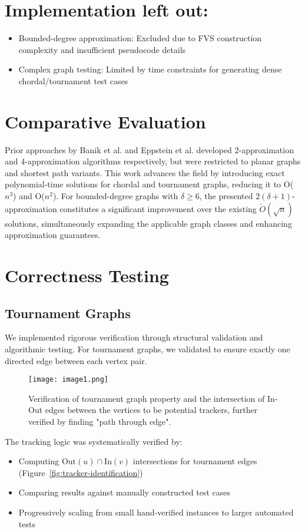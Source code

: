 \documentclass{article}
\begin{document}
\section*{Implementation left out:}
\begin{itemize}
    \item Bounded-degree approximation: Excluded due to FVS construction complexity and insufficient pseudocode details
    \item Complex graph testing: Limited by time constraints for generating dense chordal/tournament test cases
\end{itemize}

\section*{Comparative Evaluation}
Prior approaches by Banik et al. and Eppstein et al. developed 2-approximation and 4-approximation algorithms respectively, but were restricted to planar graphs and shortest path variants. This work advances the field by introducing exact polynomial-time solutions for chordal and tournament graphs, reducing it to O($n^3$) and O($n^2$). For bounded-degree graphs with $\delta \geq 6$, the presented $2(\delta+1)$-approximation constitutes a significant improvement over the existing $\widetilde{O}(\sqrt{n})$ solutions, simultaneously expanding the applicable graph classes and enhancing approximation guarantees.

\section*{Correctness Testing}

\subsection*{Tournament Graphs}
We implemented rigorous verification through structural validation and algorithmic testing. For tournament graphs, we validated to ensure exactly one directed edge between each vertex pair.

\begin{figure}[H]
\centering
\texttt{[image: image1.png]}
\caption{Verification of tournament graph property and the intersection of In-Out edges between the vertices to be potential trackers, further verified by finding "path through edge".}
\label{fig:tournament-verification}
\end{figure}

The tracking logic was systematically verified by:
\begin{itemize}
\item Computing $\text{Out}(u) \cap \text{In}(v)$ intersections for tournament edges (Figure~\ref{fig:tracker-identification})
\item Comparing results against manually constructed test cases
\item Progressively scaling from small hand-verified instances to larger automated tests
\end{itemize}
\end{document}
